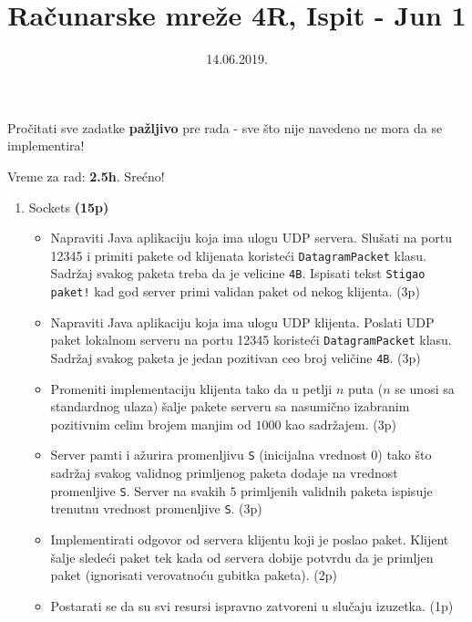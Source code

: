 \documentclass[]{article}
\title{Ra\v{c}unarske mre\v{z}e 4R, Ispit - Jun 1}
\date{14.06.2019.}
\begin{document}
\makeatletter
\begin{center}

{\fontsize{12pt}{14pt}\selectfont\bfseries\@title\par}
\@date

Pro\v{c}itati sve zadatke \textbf{pa\v{z}ljivo} pre rada - sve \v{s}to nije navedeno ne mora da se implementira! 

Vreme za rad: \textbf{2.5h}. Sre\'{c}no!
\end{center}
\makeatother


\begin{enumerate}
  \item Sockets \textbf{(15p)}
  \begin{itemize}
    \item Napraviti Java aplikaciju koja ima ulogu UDP servera. Slu\v{s}ati na portu 12345 i primiti pakete od klijenata koriste\'c{}i \texttt{DatagramPacket} klasu. Sadr\v{z}aj svakog paketa treba da je velicine \texttt{4B}. Ispisati tekst \texttt{Stigao paket!} kad god server primi validan paket od nekog klijenta. \hfill (3p)
    \item Napraviti Java aplikaciju koja ima ulogu UDP klijenta. Poslati UDP paket lokalnom serveru na portu 12345 koriste\'c{}i \texttt{DatagramPacket} klasu. Sadr\v{z}aj svakog paketa je jedan pozitivan ceo broj veli\v{c}ine \texttt{4B}. \hfill (3p)
    \item Promeniti implementaciju klijenta tako da u petlji $n$ puta ($n$ se unosi sa standardnog ulaza) \v{s}alje pakete serveru sa nasumi\v{c}no izabranim pozitivnim celim brojem manjim od $1000$ kao sadr\v{z}ajem. \hfill (3p)
    \item Server pamti i a\v{z}urira promenljivu \texttt{S} (inicijalna vrednost $0$) tako \v{s}to sadr\v{z}aj svakog validnog primljenog paketa dodaje na vrednost promenljive \texttt{S}. Server na svakih $5$ primljenih validnih paketa ispisuje trenutnu vrednost promenljive \texttt{S}. \hfill (3p)
    \item Implementirati odgovor od servera klijentu koji je poslao paket. Klijent \v{s}alje slede\'c{}i paket tek kada od servera dobije potvrdu da je primljen paket (ignorisati verovatno\'c{}u gubitka paketa). \hfill (2p)
    \item Postarati se da su svi resursi ispravno zatvoreni u slu\v{c}aju izuzetka. \hfill (1p)
  \end{itemize}


\end{enumerate}
\end{document}
